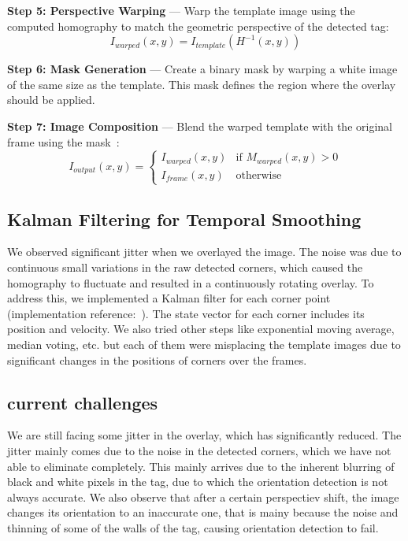 \documentclass[9pt,a4paper,twocolumn,twoside]{tau-class/tau}
\begin{document}
    \textbf{Step 5: Perspective Warping} — Warp the template image using the computed homography to match the geometric perspective of the detected tag:
    \begin{equation}
        I_{warped}(x, y) = I_{template}(H^{-1}(x, y))
    \end{equation}

    \textbf{Step 6: Mask Generation} — Create a binary mask by warping a white image of the same size as the template. This mask defines the region where the overlay should be applied.

    \textbf{Step 7: Image Composition} — Blend the warped template with the original frame using the mask~\cite{opencv_warp}:
    \begin{equation}
        I_{output}(x, y) = \begin{cases}
            I_{warped}(x, y) & \text{if } M_{warped}(x, y) > 0 \\
            I_{frame}(x, y) & \text{otherwise}
        \end{cases}
    \end{equation}

    \subsection{Kalman Filtering for Temporal Smoothing}
    We observed significant jitter when we overlayed the image. The noise was due to continuous small variations in the raw detected corners, which caused the homography to fluctuate and resulted in a continuously rotating overlay. 
    To address this, we implemented a Kalman filter for each corner point (implementation reference:~\cite{rlabbe_kalman}). The state vector for each corner includes its position and velocity.     
    We also tried other steps like exponential moving average, median voting, etc. but each of them were misplacing the template images due to significant changes in the positions of corners over the frames.
    
    \subsection{current challenges}
    We are still facing some jitter in the overlay, which has significantly reduced. The jitter mainly comes due to the noise in the detected corners, which we have not able to eliminate completely. This mainly arrives due to the inherent blurring of black and white pixels in the tag, due to which the orientation detection is not always accurate. 
    \newline
    We also observe that after a certain perspectiev shift, the image changes its orientation to an inaccurate one, that is mainy because the noise and thinning of some of the walls of the tag, causing orientation detection to fail. 
\end{document}
